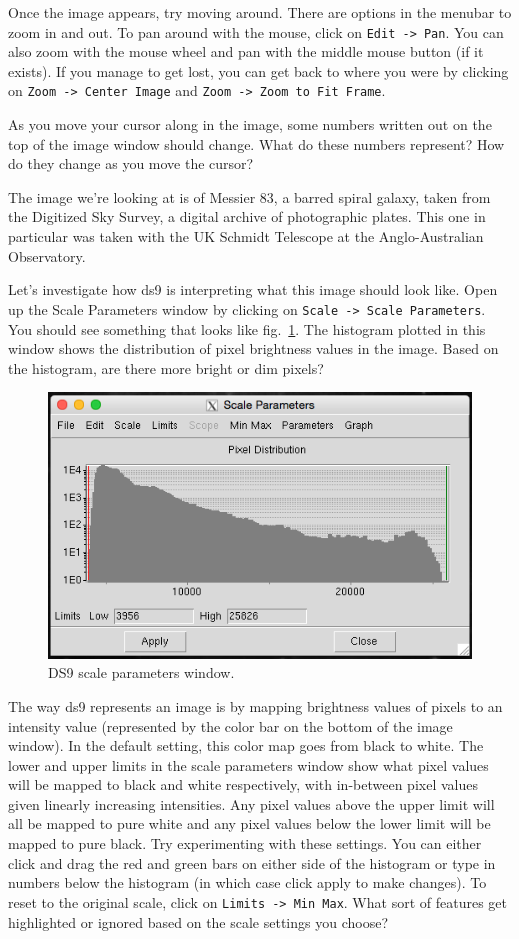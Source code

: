 \documentclass[12pt]{article}
\begin{document}
Once the image appears, try moving around.  There are options in the menubar to zoom in and out.  To pan around with the mouse, click on \texttt{Edit -> Pan}.  You can also zoom with the mouse wheel and pan with the middle mouse button (if it exists).  If you manage to get lost, you can get back to where you were by clicking on \texttt{Zoom -> Center Image} and \texttt{Zoom -> Zoom to Fit Frame}.  

As you move your cursor along in the image, some numbers written out on the top of the image window should change.  What do these numbers represent?  How do they change as you move the cursor?

The image we're looking at is of Messier 83, a barred spiral galaxy, taken from the Digitized Sky Survey, a digital archive of photographic plates.  This one in particular was taken with the UK Schmidt Telescope at the Anglo-Australian Observatory.

Let's investigate how ds9 is interpreting what this image should look like.  Open up the Scale Parameters window by clicking on \texttt{Scale -> Scale Parameters}.  You should see something that looks like fig.~\ref{fig:scale}.  The histogram plotted in this window shows the distribution of pixel brightness values in the image.  Based on the histogram, are there more bright or dim pixels?

\begin{figure}[h]
  \centering
  \includegraphics[width=0.6\linewidth]{scale.png}
  \caption{DS9 scale parameters window.}
  \label{fig:scale}
\end{figure}

The way ds9 represents an image is by mapping brightness values of pixels to an intensity value (represented by the color bar on the bottom of the image window).  In the default setting, this color map goes from black to white.  The lower and upper limits in the scale parameters window show what pixel values will be mapped to black and white respectively, with in-between pixel values given linearly increasing intensities.  Any pixel values above the upper limit will all be mapped to pure white and any pixel values below the lower limit will be mapped to pure black.  Try experimenting with these settings.  You can either click and drag the red and green bars on either side of the histogram or type in numbers below the histogram (in which case click apply to make changes).  To reset to the original scale, click on \texttt{Limits -> Min Max}.  What sort of features get highlighted or ignored based on the scale settings you choose?
\end{document}
